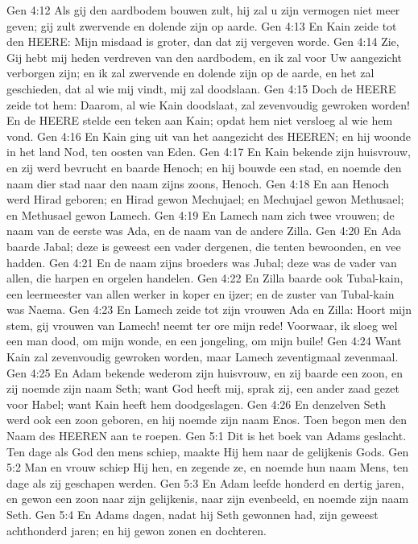 Gen 4:12  Als gij den aardbodem bouwen zult, hij zal u zijn vermogen niet meer geven; gij zult zwervende en dolende zijn op aarde.
Gen 4:13  En Kain zeide tot den HEERE: Mijn misdaad is groter, dan dat zij vergeven worde.
Gen 4:14  Zie, Gij hebt mij heden verdreven van den aardbodem, en ik zal voor Uw aangezicht verborgen zijn; en ik zal zwervende en dolende zijn op de aarde, en het zal geschieden, dat al wie mij vindt, mij zal doodslaan.
Gen 4:15  Doch de HEERE zeide tot hem: Daarom, al wie Kain doodslaat, zal zevenvoudig gewroken worden! En de HEERE stelde een teken aan Kain; opdat hem niet versloeg al wie hem vond.
Gen 4:16  En Kain ging uit van het aangezicht des HEEREN; en hij woonde in het land Nod, ten oosten van Eden.
Gen 4:17  En Kain bekende zijn huisvrouw, en zij werd bevrucht en baarde Henoch; en hij bouwde een stad, en noemde den naam dier stad naar den naam zijns zoons, Henoch.
Gen 4:18  En aan Henoch werd Hirad geboren; en Hirad gewon Mechujael; en Mechujael gewon Methusael; en Methusael gewon Lamech.
Gen 4:19  En Lamech nam zich twee vrouwen; de naam van de eerste was Ada, en de naam van de andere Zilla.
Gen 4:20  En Ada baarde Jabal; deze is geweest een vader dergenen, die tenten bewoonden, en vee hadden.
Gen 4:21  En de naam zijns broeders was Jubal; deze was de vader van allen, die harpen en orgelen handelen.
Gen 4:22  En Zilla baarde ook Tubal-kain, een leermeester van allen werker in koper en ijzer; en de zuster van Tubal-kain was Naema.
Gen 4:23  En Lamech zeide tot zijn vrouwen Ada en Zilla: Hoort mijn stem, gij vrouwen van Lamech! neemt ter ore mijn rede! Voorwaar, ik sloeg wel een man dood, om mijn wonde, en een jongeling, om mijn buile!
Gen 4:24  Want Kain zal zevenvoudig gewroken worden, maar Lamech zeventigmaal zevenmaal.
Gen 4:25  En Adam bekende wederom zijn huisvrouw, en zij baarde een zoon, en zij noemde zijn naam Seth; want God heeft mij, sprak zij, een ander zaad gezet voor Habel; want Kain heeft hem doodgeslagen.
Gen 4:26  En denzelven Seth werd ook een zoon geboren, en hij noemde zijn naam Enos. Toen begon men den Naam des HEEREN aan te roepen.
Gen 5:1  Dit is het boek van Adams geslacht. Ten dage als God den mens schiep, maakte Hij hem naar de gelijkenis Gods.
Gen 5:2  Man en vrouw schiep Hij hen, en zegende ze, en noemde hun naam Mens, ten dage als zij geschapen werden.
Gen 5:3  En Adam leefde honderd en dertig jaren, en gewon een zoon naar zijn gelijkenis, naar zijn evenbeeld, en noemde zijn naam Seth.
Gen 5:4  En Adams dagen, nadat hij Seth gewonnen had, zijn geweest achthonderd jaren; en hij gewon zonen en dochteren.
